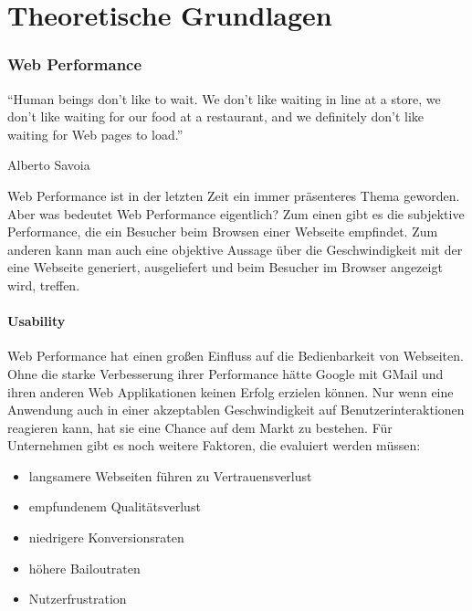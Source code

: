 \part{Theoretische Grundlagen}
\label{sec:theory}

\section{Web Performance}
\epigraph{``Human beings don’t like to wait. We don’t like waiting in line at a store, we don’t like waiting for our food at a restaurant, and we definitely don’t like waiting for Web pages to load.''}{Alberto Savoia}

Web Performance ist in der letzten Zeit ein immer präsenteres Thema geworden. Aber was bedeutet Web Performance eigentlich? Zum einen gibt es die subjektive Performance, die ein Besucher beim Browsen einer Webseite empfindet. Zum anderen kann man auch eine objektive Aussage über die Geschwindigkeit mit der eine Webseite generiert, ausgeliefert und beim Besucher im Browser angezeigt wird, treffen.
\subsection{Usability}
Web Performance hat einen großen Einfluss auf die Bedienbarkeit von Webseiten. Ohne die starke Verbesserung ihrer Performance hätte Google mit GMail und ihren anderen Web Applikationen keinen Erfolg erzielen können. Nur wenn eine Anwendung auch in einer akzeptablen Geschwindigkeit auf Benutzerinteraktionen reagieren kann, hat sie eine Chance auf dem Markt zu bestehen.
Für Unternehmen gibt es noch weitere Faktoren, die evaluiert werden müssen:
\begin{itemize}
 \item langsamere Webseiten führen zu Vertrauensverlust
 \item empfundenem Qualitätsverlust
 \item niedrigere Konversionsraten
 \item höhere Bailoutraten
 \item Nutzerfrustration
\end{itemize}


